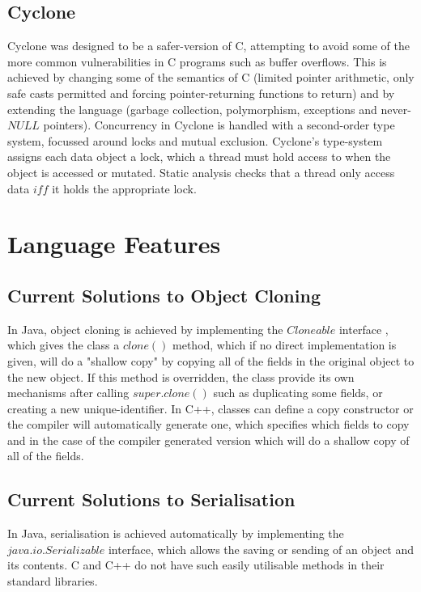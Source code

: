 \documentclass[pdftex,11pt,a4paper]{report}
\begin{document}
\subsection{Cyclone}
\label{sec:cyclone}

Cyclone was designed to be a safer-version of C, attempting to avoid some of the more common vulnerabilities in C programs such as buffer overflows.
This is achieved by changing some of the semantics of C (limited pointer arithmetic, only safe casts permitted and forcing pointer-returning functions to return) and by extending the language (garbage collection, polymorphism, exceptions and never-$NULL$ pointers).
Concurrency in Cyclone is handled with a second-order type system, focussed around locks and mutual exclusion.
Cyclone's type-system assigns each data object a lock, which a thread must hold access to when the object is accessed or mutated.
Static analysis checks that a thread only access data $iff$ it holds the appropriate lock.

\newpage
\section{Language Features}

\subsection{Current Solutions to Object Cloning}

In Java, object cloning is achieved by implementing the $Cloneable$ interface \cite{java-cloneable}, which gives the class a $clone()$ method, which if no direct implementation is given, will do a "shallow copy" by copying all of the fields in the original object to the new object.
If this method is overridden, the class provide its own mechanisms after calling $super.clone()$ such as duplicating some fields, or creating a new unique-identifier.
In C++, classes can define a copy constructor or the compiler will automatically generate one\cite{ansi:03:c++}, which specifies which fields to copy and in the case of the compiler generated version which will do a shallow copy of all of the fields.

\subsection{Current Solutions to Serialisation}

In Java, serialisation is achieved automatically by implementing the $java.io.Serializable$ \cite{java-serializable} interface, which allows the saving or sending of an object and its contents.
C and C++ do not have such easily utilisable methods in their standard libraries.
\end{document}
